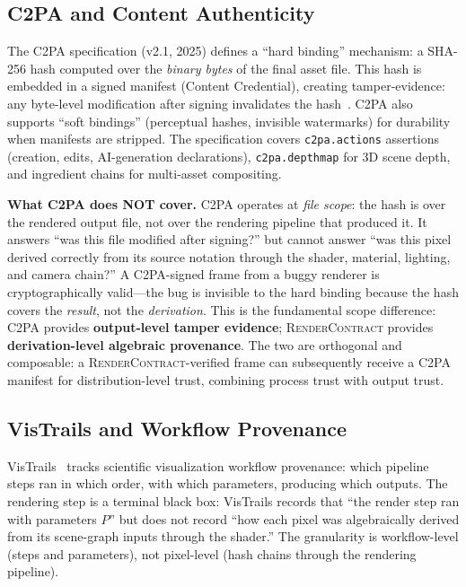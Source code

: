 \documentclass[sigconf,nonacm]{acmart}
\newcommand{\rendercontract}{\textsc{RenderContract}}
\begin{document}
\subsection{C2PA and Content Authenticity}
The C2PA specification (v2.1, 2025) defines a ``hard binding''
mechanism: a SHA-256 hash computed over the \emph{binary bytes}
of the final asset file. This hash is embedded in a signed
manifest (Content Credential), creating tamper-evidence: any
byte-level modification after signing invalidates the
hash~\cite{c2pa-spec-2.1}. C2PA also supports ``soft bindings''
(perceptual hashes, invisible watermarks) for durability when
manifests are stripped. The specification covers \texttt{c2pa.actions}
assertions (creation, edits, AI-generation declarations),
\texttt{c2pa.depthmap} for 3D scene depth, and ingredient chains
for multi-asset compositing.

\textbf{What C2PA does NOT cover.} C2PA operates at
\emph{file scope}: the hash is over the rendered output file, not
over the rendering pipeline that produced it. It answers ``was
this file modified after signing?'' but cannot answer ``was this
pixel derived correctly from its source notation through the
shader, material, lighting, and camera chain?'' A C2PA-signed
frame from a buggy renderer is cryptographically valid---the bug
is invisible to the hard binding because the hash covers the
\emph{result}, not the \emph{derivation}. This is the fundamental
scope difference: C2PA provides \textbf{output-level tamper
evidence}; \rendercontract{} provides \textbf{derivation-level
algebraic provenance}. The two are orthogonal and composable:
a \rendercontract{}-verified frame can subsequently receive a
C2PA manifest for distribution-level trust, combining process
trust with output trust.

\subsection{VisTrails and Workflow Provenance}
VisTrails~\cite{vistrails-aosa} tracks
scientific visualization workflow provenance: which pipeline
steps ran in which order, with which parameters, producing
which outputs. The rendering step is a terminal black box:
VisTrails records that ``the render step ran with parameters
$P$'' but does not record ``how each pixel was algebraically
derived from its scene-graph inputs through the shader.'' The
granularity is workflow-level (steps and parameters), not
pixel-level (hash chains through the rendering pipeline).
\end{document}
